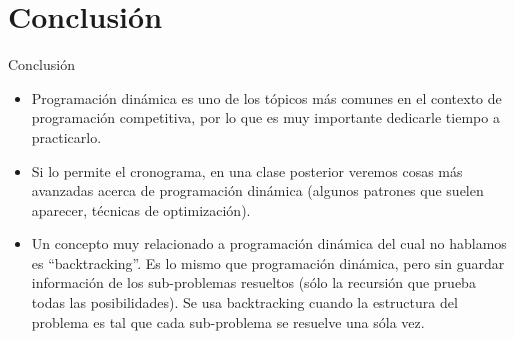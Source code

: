 \documentclass{beamer}
\begin{document}
\section{Conclusi\'on}

\begin{frame}{Conclusi\'on}
\begin{itemize}
\item
Programaci\'on din\'amica es uno de los t\'opicos m\'as comunes en el contexto de programaci\'on competitiva, por lo que es muy importante dedicarle tiempo a practicarlo.
\item
Si lo permite el cronograma, en una clase posterior veremos cosas m\'as avanzadas acerca de programaci\'on din\'amica (algunos patrones que suelen aparecer, t\'ecnicas de optimizaci\'on).
\item
Un concepto muy relacionado a programaci\'on din\'amica del cual no hablamos es ``backtracking''. Es lo mismo que programaci\'on din\'amica, pero sin guardar informaci\'on de los sub-problemas resueltos (s\'olo la recursi\'on que prueba todas las posibilidades). Se usa backtracking cuando la estructura del problema es tal que cada sub-problema se resuelve una s\'ola vez.
\end{itemize}
\end{frame}
\end{document}
